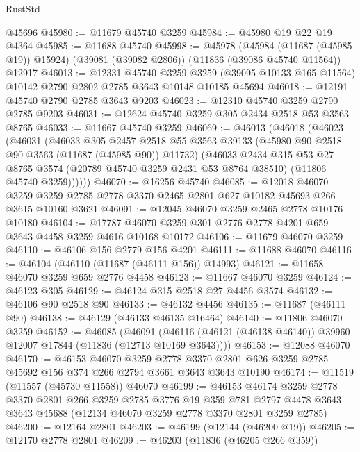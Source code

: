 \begin{lexlean}{RustStd}
\begin{coremodule}
    @45696
@45980 := @11679 @45740 @3259
@45984 := @45980 @19 @22 @19 @4364
@45985 := @11688 @45740
@45998 := @45978
    (@45984 (@11687 (@45985 @19)) @15924)
    (@39081 (@39082 @2806))
    (@11836 (@39086 @45740 @11564))
    @12917
@46013 := @12331
    @45740
    @3259
    @3259
    (@39095 @10133 @165 @11564)
    @10142
    @2790
    @2802
    @2785
    @3643
    @10148
    @10185
    @45694
@46018 := @12191 @45740 @2790 @2785 @3643 @9203
@46023 := @12310 @45740 @3259 @2790 @2785 @9203
@46031 := @12624 @45740 @3259 @305 @2434 @2518 @53 @3563 @8765
@46033 := @11667 @45740 @3259
@46069 := @46013
    (@46018
      (@46023
        (@46031
          (@46033
            @305
            @2457
            @2518
            @55
            @3563
            @39133
            (@45980 @90 @2518 @90 @3563 (@11687 (@45985 @90)) @11732)
            (@46033
              @2434
              @315
              @53
              @27
              @8765
              @3574
              (@20789 @45740 @3259 @2431 @53 @8764 @38510)
              (@11806 @45740 @3259))))))
@46070 := @16256 @45740
@46085 := @12018
    @46070
    @3259
    @3259
    @2785
    @2778
    @3370
    @2465
    @2801
    @627
    @10182
    @45693
    @266
    @3615
    @10160
    @3621
@46091 := @12045 @46070 @3259 @2465 @2778 @10176 @10180
@46104 := @17787 @46070 @3259 @301 @2776 @2778 @4201 @659 @3643 @4458 @3259 @4616 @10168 @10172
@46106 := @11679 @46070 @3259
@46110 := @46106 @156 @2779 @156 @4201
@46111 := @11688 @46070
@46116 := @46104 (@46110 (@11687 (@46111 @156)) @14993)
@46121 := @11658 @46070 @3259 @659 @2776 @4458
@46123 := @11667 @46070 @3259
@46124 := @46123 @305
@46129 := @46124 @315 @2518 @27 @4456 @3574
@46132 := @46106 @90 @2518 @90
@46133 := @46132 @4456
@46135 := @11687 (@46111 @90)
@46138 := @46129 (@46133 @46135 @16464)
@46140 := @11806 @46070 @3259
@46152 := @46085
    (@46091 (@46116 (@46121 (@46138 @46140)) @39960 @12007 @17844 (@11836 (@12713 @10169 @3643))))
@46153 := @12088 @46070
@46170 := @46153
    @46070
    @3259
    @2778
    @3370
    @2801
    @626
    @3259
    @2785
    @45692
    @156
    @374
    @266
    @2794
    @3661
    @3643
    @3643
    @10190
@46174 := @11519 (@11557 (@45730 @11558)) @46070
@46199 := @46153
    @46174
    @3259
    @2778
    @3370
    @2801
    @266
    @3259
    @2785
    @3776
    @19
    @359
    @781
    @2797
    @4478
    @3643
    @3643
    @45688
    (@12134 @46070 @3259 @2778 @3370 @2801 @3259 @2785)
@46200 := @12164 @2801
@46203 := @46199 (@12144 (@46200 @19))
@46205 := @12170 @2778 @2801
@46209 := @46203 (@11836 (@46205 @266 @359))

\end{coremodule}
\end{lexlean}
